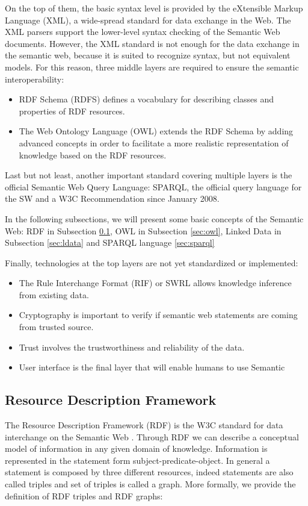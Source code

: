 On the top of them, the basic syntax level is provided by the eXtensible Markup Language (XML), a wide-spread standard for data exchange in the Web. The XML parsers support the lower-level syntax checking of the Semantic Web documents. However, the XML standard is not enough for the data exchange in the semantic web, because it is suited to recognize syntax, but not equivalent models. For this reason, three middle layers are required to ensure the semantic interoperability:
\begin{itemize}

\item RDF Schema (RDFS) defines a vocabulary for describing classes and properties of RDF resources.
\item The Web Ontology Language (OWL) extends the RDF Schema by adding advanced concepts in order to facilitate a more realistic representation of knowledge based on the RDF resources.
\end{itemize} 

Last but not least, another important standard covering multiple layers is the official Semantic Web Query Language: SPARQL,  the official query language for the SW and a W3C Recommendation since January 2008. 

In the following subsections, we will present some basic concepts of the Semantic Web:  RDF in Subsection \ref{sec:rdf},  OWL in Subsection \ref{sec:owl}, Linked Data in Subsection \ref{sec:ldata} and SPARQL language \ref{sec:sparql}

Finally, technologies at the top layers are not yet standardized or implemented:
\begin{itemize}
\item The Rule Interchange Format (RIF) or SWRL allows knowledge inference from existing data.
\item Cryptography is important to verify if semantic web statements are coming from trusted source.
\item Trust involves the trustworthiness and reliability of the data.
\item User interface is the final layer that will enable humans to use Semantic
\end{itemize} 

\subsection{Resource Description Framework}\label{sec:rdf}

The Resource Description Framework (RDF) is the W3C standard for data interchange on the Semantic Web \cite{rdfconcepts}. Through RDF we can describe a conceptual model of information in any given domain of knowledge. Information is represented in the statement form subject-predicate-object. In general a statement is composed by three different resources, indeed statements are also called triples and set of triples is called a graph. More formally, we provide the definition of RDF triples and RDF graphs:

